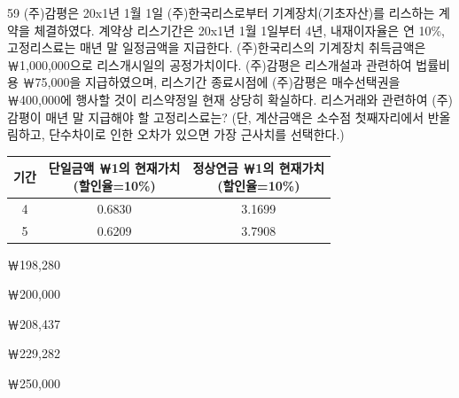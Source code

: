 \begin{question}{59}
(주)감평은 20x1년 1월 1일 (주)한국리스로부터 기계장치(기초자산)를 리스하는 계약을 체결하였다. 계약상 리스기간은 20x1년 1월 1일부터 4년, 내재이자율은 연 10\%, 고정리스료는 매년 말 일정금액을 지급한다. (주)한국리스의 기계장치 취득금액은 ￦1,000,000으로 리스개시일의 공정가치이다. (주)감평은 리스개설과 관련하여 법률비용 ￦75,000을 지급하였으며, 리스기간 종료시점에 (주)감평은 매수선택권을 ￦400,000에 행사할 것이 리스약정일 현재 상당히 확실하다. 리스거래와 관련하여 (주)감평이 매년 말 지급해야 할 고정리스료는? (단, 계산금액은 소수점 첫째자리에서 반올림하고, 단수차이로 인한 오차가 있으면 가장 근사치를 선택한다.)
\par{\small\centering\begin{tabular}{|c|c|c|}\hline
기간 & \makecell{단일금액 ￦1의 현재가치\\(할인율=10\%)} & \makecell{정상연금 ￦1의 현재가치\\(할인율=10\%)} \\ \hline
4 & 0.6830 & 3.1699 \\ \hline
5 & 0.6209 & 3.7908 \\ \hline
\end{tabular}\par}
\begin{choices}
  \item ￦198,280
  \item ￦200,000
  \item ￦208,437
  \item ￦229,282
  \item ￦250,000
\end{choices}
\end{question}

